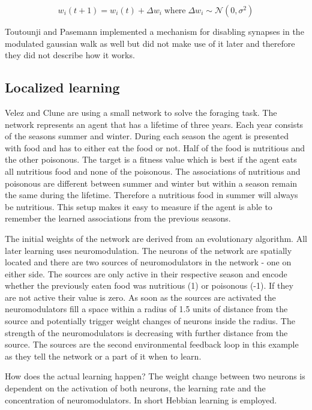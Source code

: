 \documentclass[12pt,twoside]{scrartcl}
\theoremstyle{plain}
\theoremstyle{definition}
\theoremstyle{remark}
\begin{document}
\[
    w_i (t + 1) = w_i (t) + \Delta w_i \;\text{where}\; \Delta w_i \sim \mathcal{N}(0, \sigma^2)
\]

Toutounji and Pasemann implemented a mechanism for disabling synapses
in the modulated gaussian walk as well but did not make use of it later and
therefore they did not describe how it works.

\subsection{Localized learning}
\label{subsec:diffusion}

Velez and Clune are using a small network to solve the foraging task. The network
represents an agent that has a lifetime of three years. Each year consists of
the seasons summer and winter. During each season the agent is presented with
food and has to either eat the food or not. Half of the food is nutritious
and the other poisonous. The target is a fitness value which is best if the
agent eats all nutritious food and none of the poisonous. The associations of
nutritious and poisonous are different between summer and winter but within
a season remain the same during the lifetime. Therefore a nutritious food in
summer will always be nutritious.
This setup makes it easy to measure if the agent is able to remember the learned
associations from the previous seasons.

The initial weights of the network are derived from an evolutionary algorithm.
All later learning uses neuromodulation. The neurons of the network are spatially
located and there are two sources of neuromodulators in the network - one on either
side. The sources are only active in their respective season and encode whether
the previously eaten food was nutritious (1) or poisonous (-1). If they are
not active their value is zero. As soon as the sources are activated the neuromodulators
fill a space within a radius of 1.5 units of distance from the source and potentially
trigger weight changes of neurons inside the radius. The strength of the neuromodulators
is decreasing with further distance from the source. The sources are the second
environmental feedback loop in this example as they tell the network or a part of
it when to learn.

How does the actual learning happen? The weight change between two neurons
is dependent on the activation of both neurons, the learning rate and the concentration
of neuromodulators. In short Hebbian learning is employed.
\end{document}
